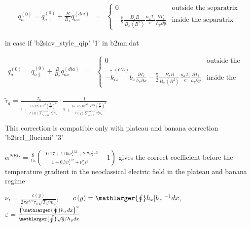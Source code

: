 \documentclass[a4paper,10pt]{report}
\begin{document}
\begin{equation}\label{eq:q0-0}
\begin{matrix}
q_a^{(0)} = q_{a\parallel}^{(0)} +
\frac B{B_x} q_{ax}^{(dia)} & =
& \left\{
\begin{matrix}
0 & \text{outside the separatrix} \\
-\frac 5 2 \frac{B_z B}{B_x \left\langle B^2 \right\rangle} \frac{n_a T_i}e \frac{\partial T_i}{h_y \partial y}
& \text{inside the separatrix}
\end{matrix} \right.
\end{matrix}
\end{equation}

in case if 'b2siav\_style\_qip' '1' in b2mn.dat


\begin{equation}\label{eq:q0-1}
\begin{matrix}
q_a^{(0)} = q_{a\parallel}^{(0)} +
\frac B{B_x} q_{ax}^{(dia)} & =
& \left\{
\begin{matrix}
0 & \text{outside the separatrix} \\
-\widetilde{\widetilde{k}}_{ix}^{(CL)} b_x \frac{ \partial T_i}{h_x \partial x}
-\frac 5 2 \frac{B_z B}{B_x \left\langle B^2 \right\rangle} \frac{n_a T_i}e \frac{\partial T_i}{h_y \partial y}
& \text{inside the separatrix}
\end{matrix} \right.
\end{matrix}
\end{equation}

$
\widetilde{\tau}_a =
\frac{\tau_a}{1+\frac{15.12\cdot 10^{16}\left(\frac{T_i}
e\right)^2}{c(y) \sum \limits^{ns-1}_{a=0} z_a^2 n_a}}
\cdot
\frac 1 {1 +
\frac{15.12 \cdot 10^{16} \cdot \varepsilon^{3/2} \left( \frac{T_i} e \right)^2}
{c(y) \sum \limits^{ns-1}_{a=0} z_a^2 n_a}}
$

This correction is compatible only with plateau and banana correction 'b2trcl\_lluciani' '3'

$\alpha^{NEO} = \frac 8{15}
\left(
\frac{-0.17 + 1.05\nu_{\ast}^{1/2} + 2.7\nu_{\ast}^2 \varepsilon^3}
{1 + 0.7\nu_{\ast}^{1/2} + \nu_{\ast}^2\varepsilon^3} -1 \right)$ gives the correct coefficient before
the temperature gradient in the neoclassical electric field in the plateau and banana regime

$\nu_{\ast} = \frac{c \left( y \right)}
{2 \pi \varepsilon^{3/2} \tau_a \sqrt{T_i/m_a}}$,\ \ \ \
$c \left( y \right) = \mathlarger{\oint} h_x |b_x|^{-1}dx$, \ \ \ \
$\varepsilon = \frac{\left(\mathlarger{\oint} h_x dx \right)^2}
{\mathlarger{\oint} \sqrt g /h_y dx}$
\end{document}
